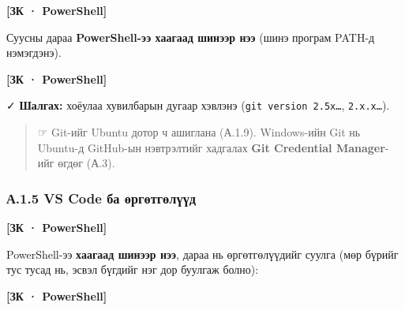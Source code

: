 \textbf{{[}ЗК · PowerShell{]}}

\begin{Shaded}
\begin{Highlighting}[]
\end{Highlighting}
\end{Shaded}

Суусны дараа \textbf{PowerShell-ээ хаагаад шинээр нээ} (шинэ програм PATH-д нэмэгдэнэ).

\textbf{{[}ЗК · PowerShell{]}}

\begin{Shaded}
\begin{Highlighting}[]
\end{Highlighting}
\end{Shaded}

✓ \textbf{Шалгах:} хоёулаа хувилбарын дугаар хэвлэнэ (\texttt{git\ version\ 2.\allowbreak{}5x\ldots{}}, \texttt{2.x.x\ldots{}}).

\begin{quote}
☞ Git-ийг Ubuntu дотор ч ашиглана (А.1.9). Windows-ийн Git нь Ubuntu-д GitHub-ын нэвтрэлтийг хадгалах \textbf{Git Credential Manager}-ийг өгдөг (А.3).
\end{quote}

\hypertarget{ux430.1.5-vs-code-ux431ux430-ux4e9ux440ux433ux4e9ux442ux433ux4e9ux43bux4afux4afux434}{%
\subsubsection{А.1.5 VS Code ба өргөтгөлүүд}\label{ux430.1.5-vs-code-ux431ux430-ux4e9ux440ux433ux4e9ux442ux433ux4e9ux43bux4afux4afux434}}

\textbf{{[}ЗК · PowerShell{]}}

\begin{Shaded}
\begin{Highlighting}[]
\end{Highlighting}
\end{Shaded}

PowerShell-ээ \textbf{хаагаад шинээр нээ}, дараа нь өргөтгөлүүдийг суулга (мөр бүрийг тус тусад нь, эсвэл бүгдийг нэг дор буулгаж болно):

\textbf{{[}ЗК · PowerShell{]}}

\begin{Shaded}
\begin{Highlighting}[]
\end{Highlighting}
\end{Shaded}

